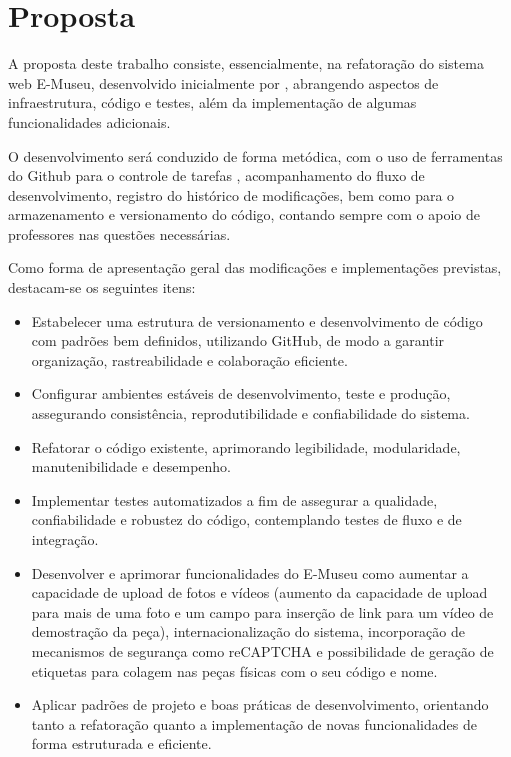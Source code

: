 \chapter{Proposta}\label{cap:proposta}

A proposta deste trabalho consiste, essencialmente, na refatoração do sistema web E-Museu, desenvolvido inicialmente por \cite{gonzaga2024}, abrangendo aspectos de infraestrutura, código e testes, além da implementação de algumas funcionalidades adicionais.

O desenvolvimento será conduzido de forma metódica, com o uso de ferramentas do Github para o controle de tarefas \cite{github}, acompanhamento do fluxo de desenvolvimento, registro do histórico de modificações, bem como para o armazenamento e versionamento do código, contando sempre com o apoio de professores nas questões necessárias.

Como forma de apresentação geral das modificações e implementações previstas, destacam-se os seguintes itens:
\begin{itemize}
    \item Estabelecer uma estrutura de versionamento e desenvolvimento de código com padrões bem definidos, utilizando GitHub, de modo a garantir organização, rastreabilidade e colaboração eficiente.
    \item Configurar ambientes estáveis de desenvolvimento, teste e produção, assegurando consistência, reprodutibilidade e confiabilidade do sistema.
    \item Refatorar o código existente, aprimorando legibilidade, modularidade, manutenibilidade e desempenho. %
    \item Implementar testes automatizados a fim de assegurar a qualidade, confiabilidade e robustez do código, contemplando testes de fluxo e de integração.
    \item Desenvolver e aprimorar funcionalidades do E-Museu como aumentar a capacidade de  upload de fotos e vídeos (aumento da capacidade de upload para mais de uma foto e um campo para inserção de link para um vídeo de demostração da peça), internacionalização do sistema, incorporação de mecanismos de segurança como reCAPTCHA e possibilidade de geração de etiquetas para colagem nas peças físicas com o seu código e nome.
    \item Aplicar padrões de projeto e boas práticas de desenvolvimento, orientando tanto a refatoração quanto a implementação de novas funcionalidades de forma estruturada e eficiente.
\end{itemize}

